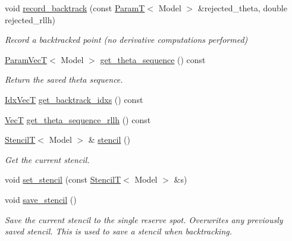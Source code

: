 \begin{DoxyCompactItemize}
void \hyperlink{classmappel_1_1IterativeMaximizer_1_1MaximizerData_ae60e71250e72ce3ce5cad912df8f16cf}{record\+\_\+backtrack} (const \hyperlink{namespacemappel_a667925cb0d6c0e49f2f035cc5a9a6857}{ParamT}$<$ Model $>$ \&rejected\+\_\+theta, double rejected\+\_\+rllh)
\begin{DoxyCompactList}\small\item\em Record a backtracked point (no derivative computations performed) \end{DoxyCompactList}\item 
\hyperlink{namespacemappel_a0f86d3153e4e27b095012f140eea58de}{Param\+VecT}$<$ Model $>$ \hyperlink{classmappel_1_1IterativeMaximizer_1_1MaximizerData_aade1d8879a22dff77c2707b379b2203e}{get\+\_\+theta\+\_\+sequence} () const 
\begin{DoxyCompactList}\small\item\em Return the saved theta sequence. \end{DoxyCompactList}\item 
\hyperlink{namespacemappel_ac63743dcd42180127307cd0e4ecdd784}{Idx\+VecT} \hyperlink{classmappel_1_1IterativeMaximizer_1_1MaximizerData_ac9d06c390f911f733c3912dbdcbae954}{get\+\_\+backtrack\+\_\+idxs} () const 
\item 
\hyperlink{namespacemappel_a2225ad69f358daa3f4f99282a35b9a3a}{VecT} \hyperlink{classmappel_1_1IterativeMaximizer_1_1MaximizerData_adda45df3816750fa019f25ff46bf9809}{get\+\_\+theta\+\_\+sequence\+\_\+rllh} () const 
\item 
\hyperlink{namespacemappel_a3a06598240007876f8c4bf834ad86197}{StencilT}$<$ Model $>$ \& \hyperlink{classmappel_1_1IterativeMaximizer_1_1MaximizerData_a29ccc1aa8e5ecf505f4ca76f6b8b214e}{stencil} ()
\begin{DoxyCompactList}\small\item\em Get the current stencil. \end{DoxyCompactList}\item 
void \hyperlink{classmappel_1_1IterativeMaximizer_1_1MaximizerData_a295d06c20f4d620602eece746f4c7d85}{set\+\_\+stencil} (const \hyperlink{namespacemappel_a3a06598240007876f8c4bf834ad86197}{StencilT}$<$ Model $>$ \&s)
\item 
void \hyperlink{classmappel_1_1IterativeMaximizer_1_1MaximizerData_a0349ede0482bdc352643e1eba2ab3f11}{save\+\_\+stencil} ()
\begin{DoxyCompactList}\small\item\em Save the current stencil to the single reserve spot. Overwrites any previously saved stencil. This is used to save a stencil when backtracking. \end{DoxyCompactList}\item 

\end{DoxyCompactItemize}
